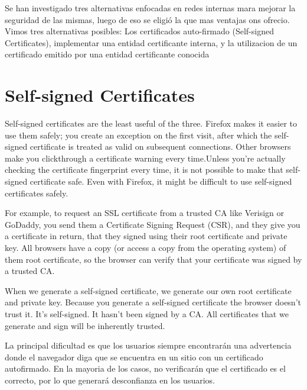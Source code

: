 


Se han investigado tres alternativas enfocadas en redes internas mara mejorar la seguridad de las 
mismas, luego de eso se eligió la que mas ventajas ons ofrecio.
Vimos tres alternativas posibles: Los certificados auto-firmado (Self-signed Certificates), implementar
una entidad certificante interna, y la utilizacion de un certificado emitido por una entidad
certificante conocida

\section{Self-signed Certificates}
Self-signed certificates are the least useful of the three. Firefox
makes it easier to use them safely; you create an exception on the
first visit, after which the self-signed certificate is treated as valid
on subsequent connections. Other browsers make you clickthrough a certificate
 warning every time.Unless you’re
actually checking the certificate fingerprint every time, it is not
possible to make that self-signed certificate safe. Even with
Firefox, it might be difficult to use self-signed certificates safely.

For example, to request an SSL certificate from a trusted CA like Verisign or GoDaddy, you send them a 
Certificate Signing Request (CSR), and they give you a certificate in return, that they signed
 using their root certificate and private key. All browsers have a copy (or access a copy from
  the operating system) of them root certificate, so the browser can verify that your certificate
   was signed by a trusted CA.

When we generate a self-signed certificate, we generate our own root certificate and private 
key. Because you generate a self-signed certificate the browser doesn’t trust it. It’s 
self-signed. It hasn’t been signed by a CA. All certificates that we generate and sign will 
be inherently trusted.

La principal dificultad es que los usuarios siempre encontrarán una advertencia 
donde el navegador diga que se encuentra en un sitio con un certificado autofirmado. 
En la mayoria de los casos, no verificarán que el certificado es el correcto, por lo que 
generará desconfianza en los usuarios.

